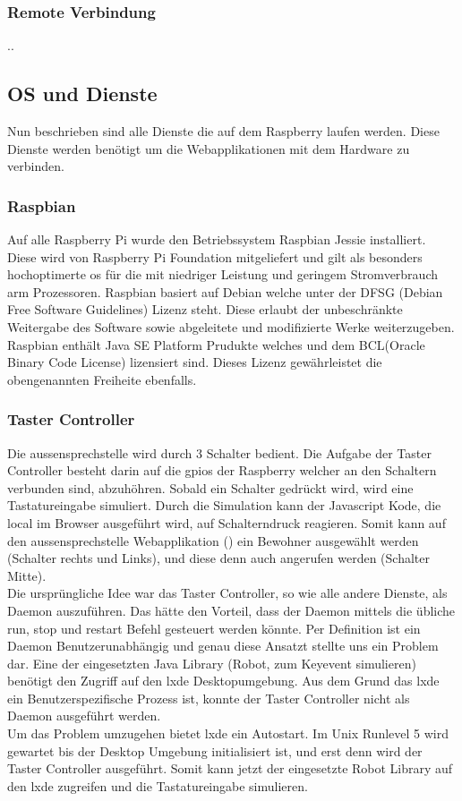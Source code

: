 \subsubsection{Remote Verbindung}
\label{kap:remote}
..


\subsection{OS und Dienste}
\label{kap:dienste}
Nun beschrieben sind alle Dienste die auf dem Raspberry laufen werden. Diese Dienste werden benötigt um die Webapplikationen mit dem Hardware zu verbinden.

\subsubsection{Raspbian}
\label{kap:raspbian}
Auf alle Raspberry Pi wurde den Betriebssystem Raspbian Jessie installiert. Diese wird von Raspberry Pi Foundation mitgeliefert und gilt als besonders hochoptimerte \gls{os} für die mit niedriger Leistung und geringem Stromverbrauch \gls{arm} Prozessoren.
Raspbian basiert auf Debian welche unter der DFSG (Debian Free Software Guidelines) Lizenz steht. Diese erlaubt der unbeschränkte Weitergabe des Software sowie abgeleitete und modifizierte  Werke weiterzugeben. 
Raspbian enthält Java SE Platform Prudukte welches und dem BCL(Oracle Binary Code License) lizensiert sind. Dieses Lizenz gewährleistet die obengenannten Freiheite ebenfalls.


\subsubsection{Taster Controller}
Die \gls{aussensprechstelle} wird durch 3 Schalter bedient. Die Aufgabe der Taster Controller besteht darin auf die \gls{gpio}s der Raspberry welcher an den Schaltern verbunden sind, abzuhöhren. Sobald ein Schalter gedrückt wird, wird eine Tastatureingabe simuliert. Durch die Simulation kann der Javascript Kode, die local im Browser ausgeführt wird, auf Schalterndruck reagieren. Somit kann auf den \gls{aussensprechstelle} Webapplikation () ein Bewohner ausgewählt werden (Schalter rechts und Links), und diese denn auch angerufen werden (Schalter Mitte).
\\
Die ursprüngliche Idee war das Taster Controller, so wie alle andere Dienste, als Daemon auszuführen. Das hätte den Vorteil, dass der Daemon mittels die übliche run, stop und restart Befehl gesteuert werden könnte.
Per Definition ist ein Daemon Benutzerunabhängig und genau diese Ansatzt stellte uns ein Problem dar. Eine der eingesetzten Java Library (Robot, zum Keyevent simulieren) benötigt den Zugriff auf den \gls{lxde} Desktopumgebung. Aus dem Grund das \gls{lxde} ein Benutzerspezifische Prozess ist, konnte der Taster Controller nicht als Daemon ausgeführt werden. 
\\
Um das Problem umzugehen bietet \gls{lxde} ein Autostart. Im Unix Runlevel 5 wird gewartet bis der Desktop Umgebung initialisiert ist, und erst denn wird der Taster Controller ausgeführt. Somit kann jetzt der eingesetzte Robot Library auf den \gls{lxde} zugreifen und die Tastatureingabe simulieren.  


